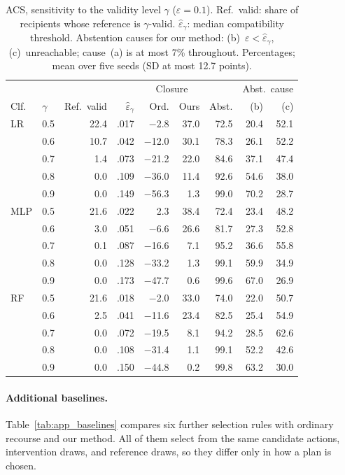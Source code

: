 \begin{table}[t]
\centering
\small
\caption{ACS, sensitivity to the validity level $\gamma$ ($\varepsilon=0.1$).
Ref.\ valid: share of recipients whose reference is $\gamma$-valid.
$\hat\varepsilon_\gamma$: median compatibility threshold. Abstention causes
for our method: (b)~$\varepsilon<\hat\varepsilon_\gamma$, (c)~unreachable;
cause~(a) is at most 7\% throughout. Percentages; mean over five seeds (SD
at most 12.7 points).}
\label{tab:gamma_acs}
\setlength{\tabcolsep}{3.5pt}
\begin{tabular}{llrrrrrrr}
\hline
& & & & \multicolumn{2}{c}{Closure} & & \multicolumn{2}{c}{Abst.\ cause} \\
Clf. & $\gamma$ & Ref.\ valid & $\hat\varepsilon_\gamma$ & Ord. & Ours & Abst. & (b) & (c) \\
\hline
LR  & 0.5 & 22.4 & .017 & $-$2.8  & 37.0 & 72.5 & 20.4 & 52.1 \\
    & 0.6 & 10.7 & .042 & $-$12.0 & 30.1 & 78.3 & 26.1 & 52.2 \\
    & 0.7 &  1.4 & .073 & $-$21.2 & 22.0 & 84.6 & 37.1 & 47.4 \\
    & 0.8 &  0.0 & .109 & $-$36.0 & 11.4 & 92.6 & 54.6 & 38.0 \\
    & 0.9 &  0.0 & .149 & $-$56.3 &  1.3 & 99.0 & 70.2 & 28.7 \\
\hline
MLP & 0.5 & 21.6 & .022 &    2.3  & 38.4 & 72.4 & 23.4 & 48.2 \\
    & 0.6 &  3.0 & .051 &  $-$6.6 & 26.6 & 81.7 & 27.3 & 52.8 \\
    & 0.7 &  0.1 & .087 & $-$16.6 &  7.1 & 95.2 & 36.6 & 55.8 \\
    & 0.8 &  0.0 & .128 & $-$33.2 &  1.3 & 99.1 & 59.9 & 34.9 \\
    & 0.9 &  0.0 & .173 & $-$47.7 &  0.6 & 99.6 & 67.0 & 26.9 \\
\hline
RF  & 0.5 & 21.6 & .018 &  $-$2.0 & 33.0 & 74.0 & 22.0 & 50.7 \\
    & 0.6 &  2.5 & .041 & $-$11.6 & 23.4 & 82.5 & 25.4 & 54.9 \\
    & 0.7 &  0.0 & .072 & $-$19.5 &  8.1 & 94.2 & 28.5 & 62.6 \\
    & 0.8 &  0.0 & .108 & $-$31.4 &  1.1 & 99.1 & 52.2 & 42.6 \\
    & 0.9 &  0.0 & .150 & $-$44.8 &  0.2 & 99.8 & 63.2 & 30.0 \\
\hline
\end{tabular}
\end{table}

\paragraph{Additional baselines.}
Table~\ref{tab:app_baselines} compares six further selection rules with
ordinary recourse and our method. All of them select from the same candidate
actions, intervention draws, and reference draws, so they differ only in how a
plan is chosen.

